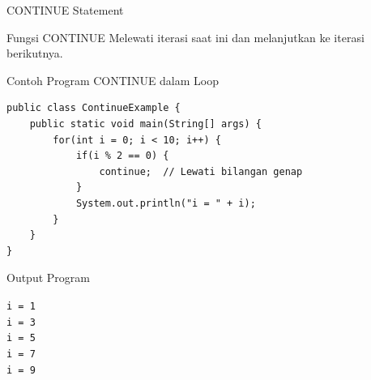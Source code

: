 \documentclass{beamer}
\begin{document}
\begin{frame}[fragile]{CONTINUE Statement}
\vspace{-0.25cm}
  \begin{block}{Fungsi CONTINUE}
  \vspace{-0.2cm}
    Melewati iterasi saat ini dan melanjutkan ke iterasi berikutnya.
  \end{block}
  \begin{exampleblock}{Contoh Program CONTINUE dalam Loop}
    \begin{lstlisting}[basicstyle=\ttfamily\tiny]
public class ContinueExample {
    public static void main(String[] args) {
        for(int i = 0; i < 10; i++) {
            if(i % 2 == 0) {
                continue;  // Lewati bilangan genap
            }
            System.out.println("i = " + i);
        }
    }
}
    \end{lstlisting}
  \end{exampleblock}

  \vspace{-0.5cm}
  \begin{block}{Output Program}
  \vspace{-0.3cm}
    \colorbox{gray!20}{
      \parbox{0.9\textwidth}{
        \texttt{\tiny i = 1\\[-5pt]
        i = 3\\[-5pt]
        i = 5\\[-5pt]
        i = 7\\[-5pt]
        i = 9}
      }
    }
  \end{block}
\end{frame}

\end{document}
